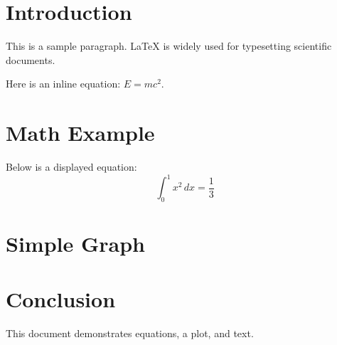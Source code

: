 \documentclass{article}
\begin{document}
\section*{Introduction}
This is a sample paragraph. LaTeX is widely used for typesetting scientific documents.

Here is an inline equation: \( E = mc^2 \).

\section*{Math Example}
Below is a displayed equation:
\[
\int_0^1 x^2\,dx = \frac{1}{3}
\]

\section*{Simple Graph}
\begin{center}
\end{center}

\section*{Conclusion}
This document demonstrates equations, a plot, and text.
\end{document}
